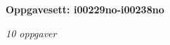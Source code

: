 \centerline{\bf Oppgavesett: i00229no-i00238no}
\vskip 10pt
\centerline{\it 10 oppgaver}\vskip 10pt
\vskip 10pt
